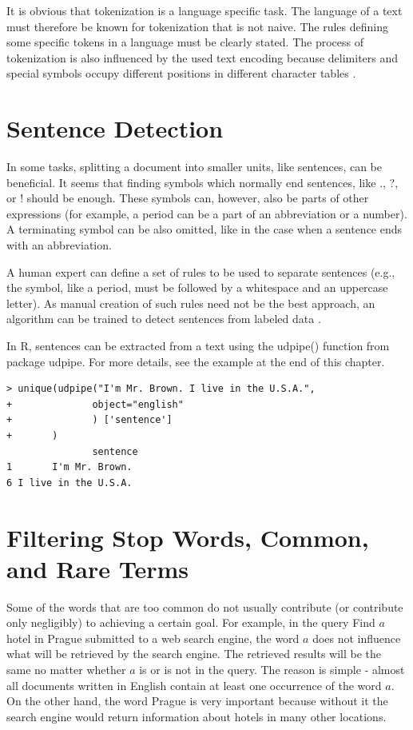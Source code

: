 \documentclass[11pt,openany,executivepaper]{book}
\begin{document}
It is obvious that tokenization is a language specific task. The language of a text must therefore be known for tokenization that is not naive. The rules defining some specific tokens in a language must be clearly stated. The process of tokenization is also influenced by the used text encoding because delimiters and special symbols occupy different positions in different character tables \cite{211}.

\section{Sentence Detection}
In some tasks, splitting a document into smaller units, like sentences, can be beneficial. It seems that finding symbols which normally end sentences, like ., ?, or ! should be enough. These symbols can, however, also be parts of other expressions (for example, a period can be a part of an abbreviation or a number). A terminating symbol can be also omitted, like in the case when a sentence ends with an abbreviation.

A human expert can define a set of rules to be used to separate sentences (e.g., the symbol, like a period, must be followed by a whitespace and an uppercase letter). As manual creation of such rules need not be the best approach, an algorithm can be trained to detect sentences from labeled data \cite{225}.

In R, sentences can be extracted from a text using the udpipe() function from package udpipe. For more details, see the example at the end of this chapter.

\begin{verbatim}
> unique(udpipe("I'm Mr. Brown. I live in the U.S.A.",
+              object="english"
+              ) ['sentence']
+       )
               sentence
1       I'm Mr. Brown.
6 I live in the U.S.A.
\end{verbatim}

\section{Filtering Stop Words, Common, and Rare Te\-rms}
Some of the words that are too common do not usually contribute (or contribute only negligibly) to achieving a certain goal. For example, in the query Find $a$ hotel in Prague submitted to a web search engine, the word $a$ does not influence what will be retrieved by the search engine. The retrieved results will be the same no matter whether $a$ is or is not in the query. The reason is simple - almost all documents written in English contain at least one occurrence of the word $a$. On the other hand, the word Prague is very important because without it the search engine would return information about hotels in many other locations.
\end{document}
